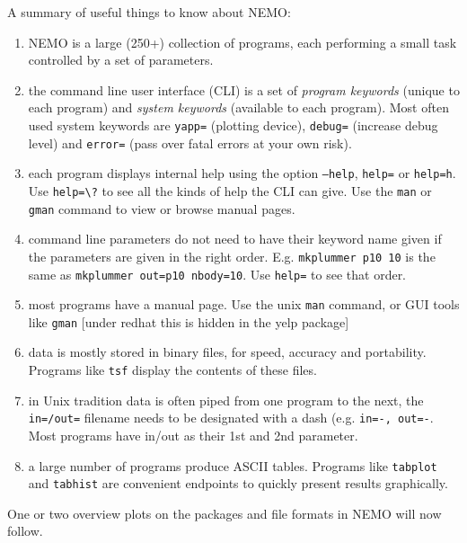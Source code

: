 A summary of useful things to know about NEMO:
\begin{enumerate}

\item
NEMO is a large (250+) collection of programs, each performing a small task
controlled by a set of parameters.

\item
the command line user interface (CLI) is a set of {\it program keywords}
(unique to each program) and {\it system keywords}
(available to each program).
Most often used system keywords are {\tt yapp=} (plotting device),
{\tt debug=} (increase debug level) and {\tt error=} (pass over fatal errors
at your own risk).

\item
each program displays internal help using the option 
{\tt --help}, {\tt help=} or {\tt help=h}. Use \verb+help=\?+ to see
all the kinds of help the CLI can give. Use
the {\tt man} or {\tt gman} command to view or browse manual pages.

\item
command line parameters do not need to have their keyword name given
if the parameters are given in the right order. 
E.g. {\tt mkplummer p10 10} is the same as 
{\tt mkplummer out=p10 nbody=10}. Use {\tt help=} to see that order.

\item
most programs have a manual page. Use the unix {\tt man} command, or
GUI tools like {\tt gman}  [under redhat this is hidden in the yelp package]

\item
data is mostly stored in binary files, for speed, accuracy and portability.
Programs like {\tt tsf} display the contents of these files.

\item
in  Unix tradition data is often piped from one program to the next, the
{\tt in=/out=} filename  needs to be designated with a dash 
(e.g. {\tt in=-, out=-}.   Most programs have in/out as their 1st and 
2nd parameter.

\item
a large number of programs produce ASCII tables. Programs like
{\tt tabplot} and {\tt tabhist} are convenient endpoints to
quickly present results graphically.

\end{enumerate}

One or two overview plots on the packages and file formats in NEMO will now follow.


